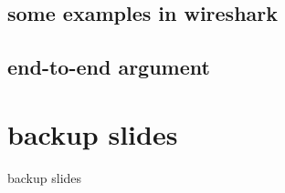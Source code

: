 \subsection{some examples in wireshark}



\subsection{end-to-end argument}




\section{backup slides}
\begin{frame}{backup slides}
\end{frame}


